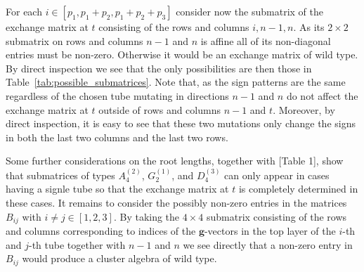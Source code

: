 \documentclass{amsart}
\numberwithin{theorem}{section}
\newcommand{\bfg}{{\boldsymbol{g}}}
\begin{document}
  For each $i\in[p_1,p_1+p_2,p_1+p_2+p_3]$ consider now the submatrix of the exchange matrix at $t$ consisting of the rows and columns $i,n-1,n$.
  As its $2\times 2$ submatrix on rows and columns $n-1$ and $n$ is affine all of its non-diagonal entries must be non-zero.
  Otherwise it would be an exchange matrix of wild type.
  By direct inspection we see that the only possibilities are then those in Table~\ref{tab:possible_submatrices}.
	Note that, as the sign patterns are the same regardless of the chosen tube mutating in directions $n-1$ and $n$ do not affect the exchange matrix at $t$ outside of rows and columns $n-1$ and $t$.
	Moreover, by direct inspection, it is easy to see that these two mutations only change the signs in both the last two columns and the last two rows.

  Some further considerations on the root lengths, together with \cite{affdenom}[Table 1], show that submatrices of types $A_{4}^{(2)}$, $G_{2}^{(1)}$, and $D_{4}^{(3)}$ can only appear in cases having a signle tube so that the exchange matrix at $t$ is completely determined in these cases.
  It remains to consider the possibly non-zero entries in the matrices $B_{ij}$ with $i\neq j\in[1,2,3]$.
  By taking the $4\times 4$ submatrix consisting of the rows and columns corresponding to indices of the $\bfg$-vectors in the top layer of the $i$-th and $j$-th tube together with $n-1$ and $n$ we see directly that a non-zero entry in $B_{ij}$ would produce a cluster algebra of wild type.
\end{document}
